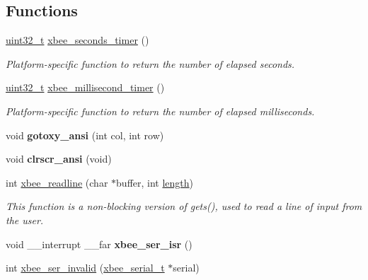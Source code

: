 \subsection*{Functions}
\begin{DoxyCompactItemize}
\item 
\hyperlink{group__hal__dos_ga09a1e304d66d35dd47daffee9731edaa}{uint32\+\_\+t} \hyperlink{group__hal__dos_gad66d00b144089426f04db771be5baa8b}{xbee\+\_\+seconds\+\_\+timer} ()
\begin{DoxyCompactList}\small\item\em Platform-\/specific function to return the number of elapsed seconds. \end{DoxyCompactList}\item 
\hyperlink{group__hal__dos_ga09a1e304d66d35dd47daffee9731edaa}{uint32\+\_\+t} \hyperlink{group__hal__dos_ga63bb246b86f72e88fa8ddc7a429c0e67}{xbee\+\_\+millisecond\+\_\+timer} ()
\begin{DoxyCompactList}\small\item\em Platform-\/specific function to return the number of elapsed milliseconds. \end{DoxyCompactList}\item 
\mbox{\label{group__hal__dos_gaf18bb6d8ede135a0bc5c13b7737be755}} 
void {\bfseries gotoxy\+\_\+ansi} (int col, int row)
\item 
\mbox{\label{group__hal__dos_gacb897f5c3c3f8fc84b84851f496371a6}} 
void {\bfseries clrscr\+\_\+ansi} (void)
\item 
int \hyperlink{group__hal__dos_ga8c0c80b64f63d395e718172190b21fcc}{xbee\+\_\+readline} (char $\ast$buffer, int \hyperlink{group__zdo_gab2b3adeb2a67e656ff030b56727fd0ac}{length})
\begin{DoxyCompactList}\small\item\em This function is a non-\/blocking version of gets(), used to read a line of input from the user. \end{DoxyCompactList}\item 
\mbox{\label{group__hal__dos_ga2d4d704dafd7a589a4305575192fb012}} 
void \+\_\+\+\_\+interrupt \+\_\+\+\_\+far {\bfseries xbee\+\_\+ser\+\_\+isr} ()
\item 
int \hyperlink{group__hal__dos_ga3c79f6b72b6cfc3cc5c4524450f661b9}{xbee\+\_\+ser\+\_\+invalid} (\hyperlink{structxbee__serial__t}{xbee\+\_\+serial\+\_\+t} $\ast$serial)

\end{DoxyCompactItemize}
